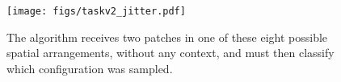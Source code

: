 \documentclass[10pt,twocolumn,letterpaper]{article}
\begin{document}



\begin{figure}[t]
\begin{center}
   \texttt{[image: figs/taskv2\_jitter.pdf]}
   \vspace{-.2cm}
\end{center}
   \caption{The algorithm receives two patches in one of these eight possible spatial arrangements, without any context, and must then classify which configuration was sampled. }
   \vspace{-.2in}
\label{fig:task}
\end{figure}

\end{document}
